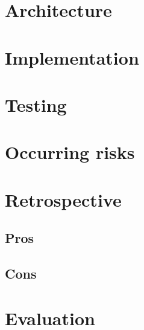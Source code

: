 \section{Architecture}
\section{Implementation}
\section{Testing}
\section{Occurring risks}
\section{Retrospective}
\subsection{Pros}
\subsection{Cons}
\section{Evaluation}
